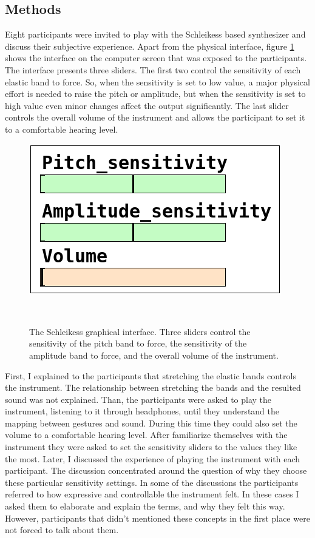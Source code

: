 \documentclass{sigchi}
\begin{document}
\subsection{Methods}

Eight participants were invited to play with the Schleikess based synthesizer and discuss their subjective experience.
Apart from the physical interface, figure \ref{fig:pd-interface} shows the interface on the computer screen that was exposed to the participants.
The interface presents three sliders.
The first two control the sensitivity of each elastic band to force.
So, when the sensitivity is set to low value, a major physical effort is needed to raise the pitch or amplitude, but when the sensitivity is set to high value even minor changes affect the output significantly.
The last slider controls the overall volume of the instrument and allows the participant to set it to a comfortable hearing level.

\begin{figure}
  \centering
  \includegraphics[width=0.9\columnwidth]{figures/pd_interface}
  \caption{The Schleikess graphical interface. Three sliders control the sensitivity of the pitch band to force, the sensitivity of the amplitude band to force, and the overall volume of the instrument.}~\label{fig:pd-interface}
\end{figure}

First, I explained to the participants that stretching the elastic bands controls the instrument.
The relationship between stretching the bands and the resulted sound was not explained.
Than, the participants were asked to play the instrument, listening to it through headphones, until they understand the mapping between gestures and sound.
During this time they could also set the volume to a comfortable hearing level.
After familiarize themselves with the instrument they were asked to set the sensitivity sliders to the values they like the most.
Later, I discussed the experience of playing the instrument with each participant.
The discussion concentrated around the question of why they choose these particular sensitivity settings.
In some of the discussions the participants referred to how expressive and controllable the instrument felt.
In these cases I asked them to elaborate and explain the terms, and why they felt this way.
However, participants that didn't mentioned these concepts in the first place were not forced to talk about them.
\end{document}
